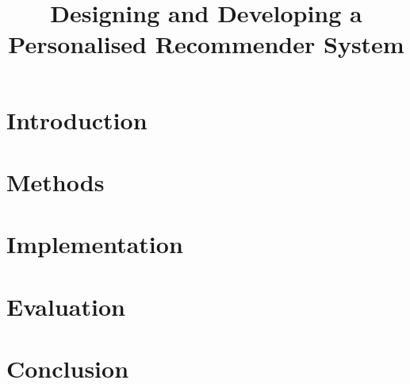 \documentclass[conference]{IEEEtran}
\begin{document}
    \title{Designing and Developing a Personalised Recommender System}

    \author{
    }

    \maketitle

%


    \section{Introduction}\label{sec:introduction}
    


    \section{Methods}\label{sec:methods}
    


    \section{Implementation}\label{sec:implementation}
    


    \section{Evaluation}\label{sec:evaluation}
    


    \section{Conclusion}\label{sec:conclusion}
    
\end{document}
